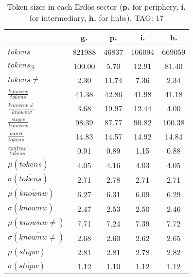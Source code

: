 \begin{table}[h!]
\begin{center}
\begin{tabular}{| l || c | c | c | c |}\hline
 & {\bf g.} & {\bf p.} & {\bf i.} & {\bf h.} \\\hline\hline
$tokens$ & 821988  & 46837  & 106094  & 669059 \\
$tokens_{\%}$ & 100.00  & 5.70  & 12.91  & 81.40 \\
$tokens \neq$ & 2.30  & 11.74  & 7.36  & 2.34 \\\hline
$\frac{knownw}{tokens}$ & 41.38  & 42.86  & 41.98  & 41.18 \\
$\frac{knownw \neq}{knownw}$ & 3.68  & 19.97  & 12.44  & 4.00 \\\hline
$\frac{stopw}{knownw}$ & 98.39  & 87.77  & 90.82  & 100.38 \\
$\frac{punct}{tokens}$ & 14.83  & 14.57  & 14.92  & 14.84 \\
$\frac{contrac}{tokens}$ & 0.91  & 0.89  & 1.15  & 0.88 \\\hline\hline
$\mu(\overline{tokens})$ & 4.05  & 4.16  & 4.03  & 4.05 \\
$\sigma(\overline{tokens})$ & 2.71  & 2.78  & 2.71  & 2.71 \\\hline
$\mu(\overline{knownw})$ & 6.27  & 6.31  & 6.09  & 6.29 \\
$\sigma(\overline{knownw})$ & 2.47  & 2.53  & 2.50  & 2.46 \\\hline
$\mu(\overline{knownw \neq})$ & 7.71  & 7.24  & 7.39  & 7.72 \\
$\sigma(\overline{knownw \neq})$ & 2.68  & 2.60  & 2.62  & 2.65 \\\hline
$\mu(\overline{stopw})$ & 2.81  & 2.81  & 2.78  & 2.82 \\
$\sigma(\overline{stopw})$ & 1.12  & 1.10  & 1.12  & 1.12 \\\hline
\end{tabular}
\caption{Token sizes in each Erd\"os sector ({{\bf p.}} for periphery, {{\bf i.}} for intermediary, {{\bf h.}} for hubs). TAG: 17}
\end{center}
\end{table}